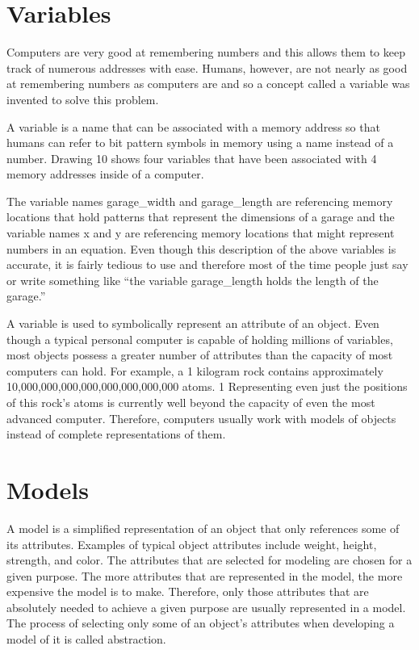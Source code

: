 \documentclass[12pt,oneside]{book}
\begin{document}
\section[Variables]{Variables}

Computers are very good at remembering numbers and this allows them to keep track of numerous addresses with ease. Humans, however, are not nearly as good at remembering numbers as computers are and so a concept called a variable was invented to solve this problem. 

A variable is a name that can be associated with a memory address so that humans can refer to bit pattern symbols in memory using a name instead of a number. Drawing 10 shows four variables that have been associated with 4 memory addresses inside of a computer. 

The variable names garage\_width and garage\_length are referencing memory locations that hold patterns that represent the dimensions of a garage and the variable names x and y are referencing memory locations that might represent numbers in an equation. Even though this description of the above variables is accurate, it is fairly tedious to use and therefore most of the time people just say or write something like ``the variable garage\_length holds the length of the garage.'' 

A variable is used to symbolically represent an attribute of an object. Even though a typical personal computer is capable of holding millions of variables, most objects possess a greater number of attributes than the capacity of most computers can hold. For example, a 1 kilogram rock contains approximately 10,000,000,000,000,000,000,000,000 atoms. 1 Representing even just the positions of this rock's atoms is currently well beyond the capacity of even the most advanced computer. Therefore, computers usually work with models of objects instead of complete representations of them.

\section[Models]{Models}

A model is a simplified representation of an object that only references some of its attributes. Examples of typical object attributes include weight, height, strength, and color. The attributes that are selected for modeling are chosen for a given purpose. The more attributes that are represented in the model, the more expensive the model is to make. Therefore, only those attributes that are absolutely needed to achieve a given purpose are usually represented in a model. The process of selecting only some of an object's attributes when developing a model of it is called abstraction. 
\end{document}
